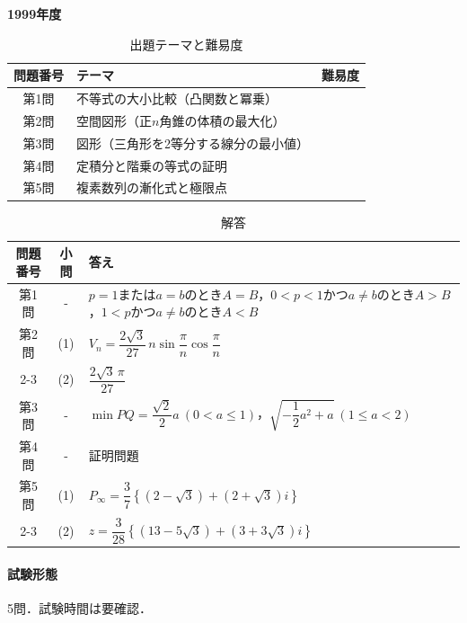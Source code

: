 \documentclass[../../main.tex]{subfiles}
\begin{document}
\begin{center}
  {\fontsize{48pt}{58pt}\selectfont \textbf{1999}\normalsize\textbf{年度}}
\end{center}

\begin{table}[htb]
  \centering
  \caption{出題テーマと難易度}
  \begin{tabular}{|c|p{9cm}|c|}
    \hline
    \textbf{問題番号} & \textbf{テーマ} & \textbf{難易度} \\
    \hline
    第1問 & 不等式の大小比較（凸関数と冪乗） & \\
    \hline
    第2問 & 空間図形（正$n$角錐の体積の最大化） & \\
    \hline
    第3問 & 図形（三角形を2等分する線分の最小値） & \\
    \hline
    第4問 & 定積分と階乗の等式の証明 & \\
    \hline
    第5問 & 複素数列の漸化式と極限点 & \\
    \hline
  \end{tabular}
\end{table}

\begin{table}[htb]
  \centering
  \caption{解答}
  \renewcommand{\arraystretch}{1.4}
  \begin{tabular}{|c|c|p{9cm}|}
    \hline
    \textbf{問題番号} & \textbf{小問} & \textbf{答え} \\
    \hline
    第1問 & - & $p=1$または$a=b$のとき$A=B$，$0<p<1$かつ$a\ne b$のとき$A>B$，$1<p$かつ$a\ne b$のとき$A<B$ \\
    \hline
    第2問 & (1) & $V_n=\dfrac{2\sqrt{3}}{27}\,n\sin\dfrac{\pi}{n}\cos\dfrac{\pi}{n}$ \\
    \cline{2-3}
    & (2) & $\dfrac{2\sqrt{3}\,\pi}{27}$ \\
    \hline
    第3問 & - & $\min PQ=\dfrac{\sqrt{2}}{2}a\ (0<a\le1)$，$\sqrt{-\dfrac{1}{2}a^2+a}\ (1\le a<2)$ \\
    \hline
    第4問 & - & 証明問題 \\
    \hline
    第5問 & (1) & $P_\infty=\dfrac{3}{7}\left\{(2-\sqrt{3})+(2+\sqrt{3})i\right\}$ \\
    \cline{2-3}
    & (2) & $z=\dfrac{3}{28}\left\{(13-5\sqrt{3})+(3+3\sqrt{3})i\right\}$ \\
    \hline
  \end{tabular}
\end{table}

\paragraph{試験形態}
5問．試験時間は要確認．
\end{document}
